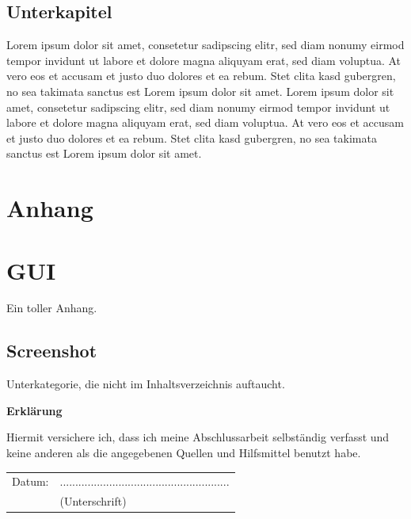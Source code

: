 \documentclass[12pt,a4paper,bibliography=totocnumbered,listof=totocnumbered]{scrartcl}
\begin{document}
\subsection{Unterkapitel}
Lorem ipsum dolor sit amet, consetetur sadipscing elitr, sed diam nonumy eirmod tempor invidunt ut labore et dolore magna aliquyam erat, sed diam voluptua. At vero eos et accusam et justo duo dolores et ea rebum. Stet clita kasd gubergren, no sea takimata sanctus est Lorem ipsum dolor sit amet. Lorem ipsum dolor sit amet, consetetur sadipscing elitr, sed diam nonumy eirmod tempor invidunt ut labore et dolore magna aliquyam erat, sed diam voluptua. At vero eos et accusam et justo duo dolores et ea rebum. Stet clita kasd gubergren, no sea takimata sanctus est Lorem ipsum dolor sit amet.
\pagebreak

\renewcommand\refname{Quellenverzeichnis}


\pagebreak

\setcounter{page}{1}

\begin{appendix}
\section*{Anhang}
{}

\section{GUI}
Ein toller Anhang.

\subsection*{Screenshot}
\label{app:screenshot}
Unterkategorie, die nicht im Inhaltsverzeichnis auftaucht.

\end{appendix}


\newpage
\thispagestyle{empty}
\begin{center}
	\vspace*{5em}
	\huge\textbf{Erklärung}\\
\end{center}
\vspace{2em}
Hiermit versichere ich, dass ich meine Abschlussarbeit selbständig verfasst und keine anderen als die angegebenen Quellen und Hilfsmittel benutzt habe.

\vspace{4em}
\begin{minipage}{\linewidth}
	\begin{tabular}{p{15em}p{15em}}
		Datum: &  .......................................................\\
		& \centering (Unterschrift)\\
	\end{tabular}
\end{minipage}
\end{document}
